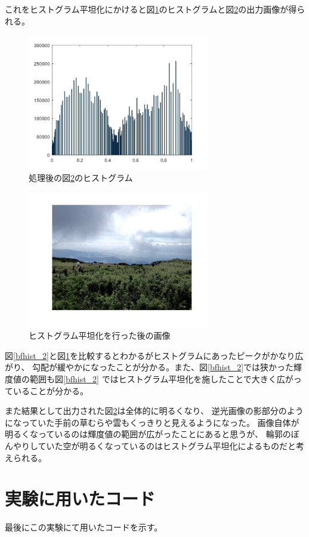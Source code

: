 \documentclass[a4paper,11pt,dvipdfmx]{jsarticle}
\begin{document}
これをヒストグラム平坦化にかけると図\ref{afhist_2}のヒストグラムと図\ref{afMtIbuki}の出力画像が得られる。
\begin{figure}[htbp]
    \centering
    \includegraphics[width=80mm]{./img/flatten_afterfunc.jpg}
    \caption{処理後の図\ref{afMtIbuki}のヒストグラム}
    \label{afhist_2}
\end{figure}
\begin{figure}[htbp]
    \centering
    \includegraphics[width=80mm]{./img/flatten_afterimg.jpg}
    \caption{ヒストグラム平坦化を行った後の画像}
    \label{afMtIbuki}
\end{figure}

図\ref{bfhist_2}と図\ref{afhist_2}を比較するとわかるがヒストグラムにあったピークがかなり広がり、
勾配が緩やかになったことが分かる。また、図\ref{bfhist_2}では狭かった輝度値の範囲も図\ref{bfhist_2}
ではヒストグラム平坦化を施したことで大きく広がっていることが分かる。

また結果として出力された図\ref{afMtIbuki}は全体的に明るくなり、
逆光画像の影部分のようになっていた手前の草むらや雲もくっきりと見えるようになった。
画像自体が明るくなっているのは輝度値の範囲が広がったことにあると思うが、
輪郭のぼんやりしていた空が明るくなっているのはヒストグラム平坦化によるものだと考えられる。

\section{実験に用いたコード}
最後にこの実験にて用いたコードを示す。



\end{document}
